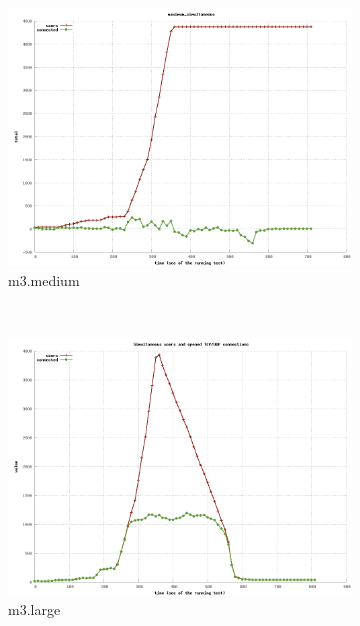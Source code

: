 \documentclass[dvips,12pt]{article}
\begin{document}
\begin{figure}[h!]
    \centering
    \begin{subfigure}[b]{0.3\textwidth}
        \includegraphics[width=\textwidth]{images/users_simul_medium.png}
        \caption{m3.medium}
    \end{subfigure}
    ~ 
    \begin{subfigure}[b]{0.3\textwidth}
        \includegraphics[width=\textwidth]{images/users_simul_large.png}
        \caption{m3.large}
    \end{subfigure}
    ~ 
    \begin{subfigure}[b]{0.3\textwidth}

\end{subfigure}
\end{figure}
\end{document}
